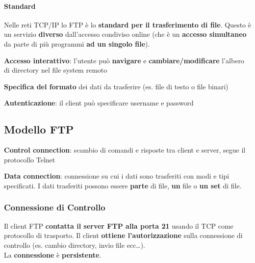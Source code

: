 \documentclass[10pt]{article}
\begin{document}
\paragraph{Standard} Nelle reti TCP/IP lo FTP è lo \textbf{standard per il trasferimento di file}. Questo è un servizio \textbf{diverso} dall'accesso condiviso online (che è un \textbf{accesso simultaneo} da parte di più programmi \textbf{ad un singolo file}).\\
\begin{list}{}{L'FTP fornisce anche \textbf{funzionalità aggiuntive} oltre al semplice trasferimento di file:}
\item \textbf{Accesso interattivo}: l'utente può \textbf{navigare} e \textbf{cambiare/modificare} l'albero di directory nel file system remoto
\item \textbf{Specifica del formato} dei dati da trasferire (es. file di testo o file binari)
\item \textbf{Autenticazione}: il client può specificare username e password
\end{list}
\subsection{Modello FTP}
\begin{list}{}{L'FTP ha \textbf{due tipi di connessione}:}
\item \textbf{Control connection}: scambio di comandi e risposte tra client e server, segue il protocollo Telnet
\item \textbf{Data connection}: connessione su cui i dati sono trasferiti con modi e tipi specificati. I dati trasferiti possono essere \textbf{parte} di file, \textbf{un} file o \textbf{un set} di file.
\end{list}
\subsubsection{Connessione di Controllo}
Il client FTP \textbf{contatta il server FTP alla porta 21} usando il TCP come protocollo di trasporto. Il client \textbf{ottiene l'autorizzazione} sulla connessione di controllo (es. cambio directory, invio file ecc\ldots).\\
La \textbf{connessione} è \textbf{persistente}.
\end{document}
